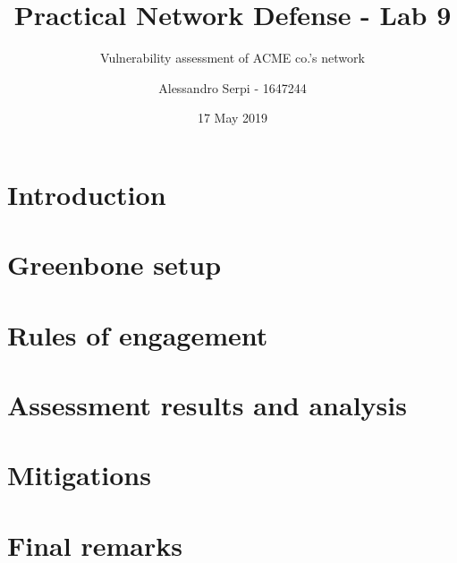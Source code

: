 \documentclass[draft]{homework}
\title{Practical Network Defense - Lab 9}
\subtitle{Vulnerability assessment of ACME co.'s network}
\author{Alessandro Serpi - 1647244}
\date{17 May 2019}
\begin{document}
    \maketitle
    \tableofcontents
    
    
    \pagebreak
    \section{Introduction}
    
    
    \section{Greenbone setup}
    
    
    \section{Rules of engagement}
    
    
    \section{Assessment results and analysis}
    
    
    \section{Mitigations}
    
    
    \section{Final remarks}
\end{document}
